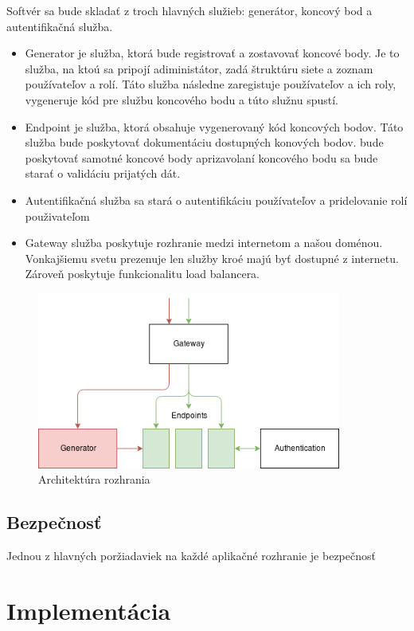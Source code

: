 Softvér sa bude skladať z troch hlavných služieb: generátor, koncový bod a autentifikačná služba.
\begin{itemize}
	\item Generator je služba, ktorá bude registrovať a zostavovať koncové body. Je to služba, na ktoú sa pripojí adiministátor, zadá štruktúru siete a zoznam používateľov a rolí. Táto služba následne zaregistuje používateľov a ich roly, vygeneruje kód pre službu koncového bodu a túto služnu spustí.
	\item Endpoint je služba, ktorá obsahuje vygenerovaný kód koncových bodov. Táto služba bude poskytovať dokumentáciu dostupných konových bodov. bude poskytovať samotné koncové body aprizavolaní koncového bodu sa bude starať o validáciu prijatých dát.
	\item Autentifikačná služba sa stará o autentifikáciu používateľov a pridelovanie rolí použivateľom
	\item Gateway služba poskytuje rozhranie medzi internetom a našou doménou. Vonkajšiemu svetu prezenuje len služby kroé majú byť dostupné z internetu. Zároveň poskytuje funkcionalitu load balancera.
\end{itemize}


\begin{figure}[!htbp]
	\centering
	\includegraphics[width=10cm]{img/architecture.png}
	\caption{Architektúra rozhrania}
	\label{architecture}
\end{figure} 


\subsection{Bezpečnosť}
Jednou z hlavných poržiadaviek na každé aplikačné rozhranie je bezpečnosť 


\section{Implementácia} 

